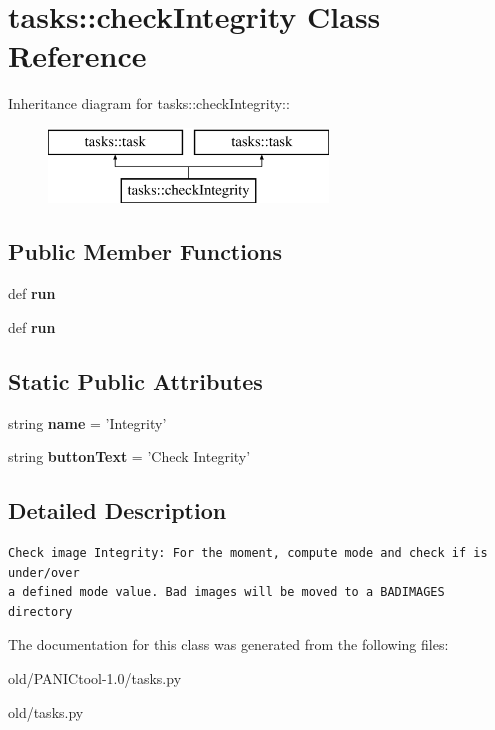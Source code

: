 \section{tasks::check\-Integrity Class Reference}
\label{classtasks_1_1checkIntegrity}
Inheritance diagram for tasks::check\-Integrity::\begin{figure}[H]
\begin{center}
\leavevmode
\includegraphics[height=2cm]{classtasks_1_1checkIntegrity}
\end{center}
\end{figure}
\subsection*{Public Member Functions}
\begin{CompactItemize}
\item 
def \textbf{run}\label{classtasks_1_1checkIntegrity_d99d0317b8fed824abc8e321d80d6e1f}

\item 
def \textbf{run}\label{classtasks_1_1checkIntegrity_d99d0317b8fed824abc8e321d80d6e1f}

\end{CompactItemize}
\subsection*{Static Public Attributes}
\begin{CompactItemize}
\item 
string \textbf{name} = '{\bfcheck\-Integrity}'\label{classtasks_1_1checkIntegrity_9fdf082ac655a342a8dc25f091b03369}

\item 
string \textbf{button\-Text} = 'Check Integrity'\label{classtasks_1_1checkIntegrity_a05a9c7fa45d9970c65cad1f754a299f}

\end{CompactItemize}


\subsection{Detailed Description}


\footnotesize\begin{verbatim}Check image Integrity: For the moment, compute mode and check if is under/over
a defined mode value. Bad images will be moved to a BADIMAGES directory

\end{verbatim}
\normalsize
 



The documentation for this class was generated from the following files:\begin{CompactItemize}
\item 
old/PANICtool-1.0/tasks.py\item 
old/tasks.py\end{CompactItemize}

